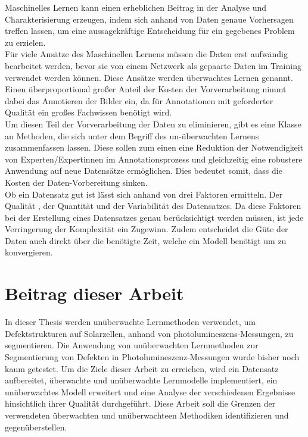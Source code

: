 Maschinelles Lernen kann einen erheblichen Beitrag in der Analyse und Charakterisierung erzeugen, indem sich anhand von Daten genaue Vorhersagen treffen lassen, um eine aussagekräftige Entscheidung für ein gegebenes Problem zu erzielen. \\
Für viele Ansätze des Maschinellen Lernens müssen die Daten erst aufwändig bearbeitet werden, bevor sie von einem Netzwerk  als gepaarte Daten im Training verwendet werden können. Diese Ansätze werden überwachtes Lernen genannt. Einen überproportional großer Anteil der Kosten der Vorverarbeitung nimmt dabei das Annotieren der Bilder ein, da für Annotationen mit geforderter Qualität ein großes Fachwissen benötigt wird. \\
Um diesen Teil der Vorverarbeitung der Daten zu eliminieren, gibt es eine Klasse an Methoden, die sich unter dem Begriff des un-überwachten Lernens zusammenfassen lassen. Diese sollen zum einen eine Reduktion der Notwendigkeit von Experten/Expertinnen im Annotationsprozess und gleichzeitig eine robustere Anwendung auf neue Datensätze ermöglichen. Dies bedeutet somit, dass die Kosten der Daten-Vorbereitung sinken. \\
Ob ein Datensatz gut ist lässt sich anhand von drei Faktoren ermitteln. Der Qualität , der Quantität und der Variabilität des Datensatzes. Da diese Faktoren bei der Erstellung eines  Datensatzes genau berücksichtigt werden müssen, ist jede Verringerung der Komplexität ein Zugewinn. Zudem entscheidet die Güte der Daten auch direkt über die benötigte Zeit, welche ein Modell benötigt um zu konvergieren.

\section{Beitrag dieser Arbeit}

In dieser Thesis werden unüberwachte Lernmethoden verwendet, um Defektstrukturen auf Solarzellen, anhand von photolumineszens-Messungen, zu segmentieren. 
Die Anwendung von unüberwachten Lernmethoden zur Segmentierung von Defekten in Photolumineszenz-Messungen wurde bisher noch kaum getestet. Um die Ziele dieser Arbeit zu erreichen, wird ein Datensatz aufbereitet, überwachte und unüberwachte Lernmodelle implementiert, ein unüberwachtes Modell erweitert und eine Analyse der verschiedenen Ergebnisse hinsichtlich ihrer Qualität durchgeführt. Diese Arbeit soll die Grenzen der verwendeten überwachten und unüberwachteen Methodiken identifizieren und gegenüberstellen.

